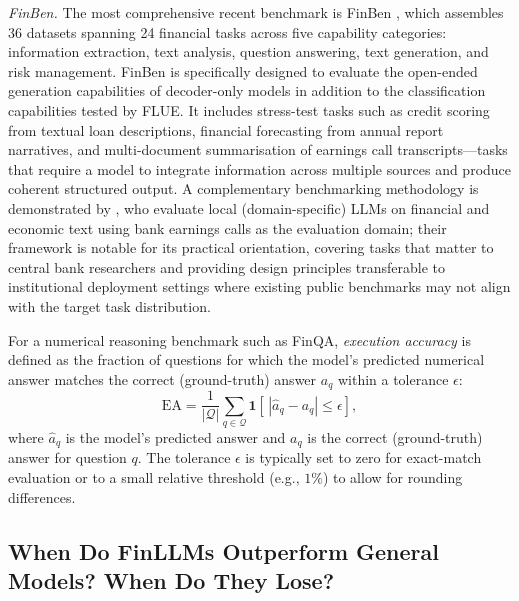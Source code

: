 \textit{FinBen.}  The most comprehensive recent benchmark is FinBen
\cite{xie2024finben}, which assembles 36 datasets spanning 24 financial
tasks across five capability categories: information extraction, text analysis,
question answering, text generation, and risk management.  FinBen is
specifically designed to evaluate the open-ended generation capabilities of
decoder-only models in addition to the classification capabilities tested by FLUE.
It includes stress-test tasks such as credit scoring from textual loan descriptions,
financial forecasting from annual report narratives, and multi-document
summarisation of earnings call transcripts---tasks that require a model to
integrate information across multiple sources and produce coherent structured output.
A complementary benchmarking methodology is demonstrated by \citet{CookKazinnik2023},
who evaluate local (domain-specific) LLMs on financial and economic text using
bank earnings calls as the evaluation domain; their framework is notable for
its practical orientation, covering tasks that matter to central bank researchers
and providing design principles transferable to institutional deployment settings
where existing public benchmarks may not align with the target task distribution.

\begin{definition}
\label{def:ch08-execution-accuracy}
For a numerical reasoning benchmark such as FinQA, \emph{execution accuracy}
is defined as the fraction of questions for which the model's predicted numerical
answer matches the correct (ground-truth) answer $a_q$ within a tolerance $\epsilon$:
\begin{equation}
  \mathrm{EA} = \frac{1}{|\mathcal{Q}|} \sum_{q \in \mathcal{Q}}
  \mathbf{1}\!\left[\,\left|\hat{a}_q - a_q\right| \leq \epsilon\right],
  \label{eq:ch08-execution-accuracy}
\end{equation}
where $\hat{a}_q$ is the model's predicted answer and $a_q$ is the correct (ground-truth) answer
for question $q$.  The tolerance $\epsilon$ is typically set to zero for
exact-match evaluation or to a small relative threshold (e.g., $1\%$) to allow
for rounding differences.
\end{definition}

\subsection{When Do FinLLMs Outperform General Models? When Do They Lose?}
\label{sec:ch08-finllm-vs-general}

